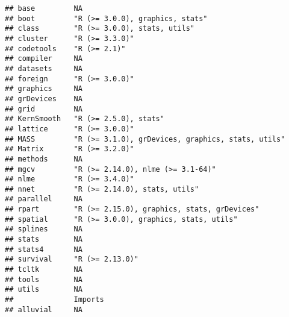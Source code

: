 \documentclass[]{book}
\begin{document}
\begin{verbatim}
## base         NA                                               
## boot         "R (>= 3.0.0), graphics, stats"                  
## class        "R (>= 3.0.0), stats, utils"                     
## cluster      "R (>= 3.3.0)"                                   
## codetools    "R (>= 2.1)"                                     
## compiler     NA                                               
## datasets     NA                                               
## foreign      "R (>= 3.0.0)"                                   
## graphics     NA                                               
## grDevices    NA                                               
## grid         NA                                               
## KernSmooth   "R (>= 2.5.0), stats"                            
## lattice      "R (>= 3.0.0)"                                   
## MASS         "R (>= 3.1.0), grDevices, graphics, stats, utils"
## Matrix       "R (>= 3.2.0)"                                   
## methods      NA                                               
## mgcv         "R (>= 2.14.0), nlme (>= 3.1-64)"                
## nlme         "R (>= 3.4.0)"                                   
## nnet         "R (>= 2.14.0), stats, utils"                    
## parallel     NA                                               
## rpart        "R (>= 2.15.0), graphics, stats, grDevices"      
## spatial      "R (>= 3.0.0), graphics, stats, utils"           
## splines      NA                                               
## stats        NA                                               
## stats4       NA                                               
## survival     "R (>= 2.13.0)"                                  
## tcltk        NA                                               
## tools        NA                                               
## utils        NA                                               
##              Imports                                                                                                                                                                                                                                                                                                                                                                                                                                                                                                     
## alluvial     NA                                                                                                                                                                                                                                                                                                                                                                                                                                                                                                          

\end{verbatim}
\end{document}
